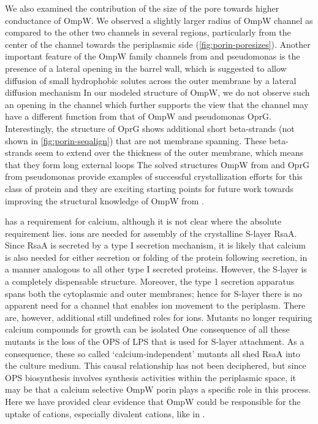 We also examined the contribution of the size of the pore towards higher conductance of \caulobacter OmpW. We observed a slightly larger radius of \caulobacter OmpW channel as compared to the other two channels in several regions, particularly from the center of the channel towards the periplasmic side (\cref{fig:porin-poresizes}). Another important feature of the OmpW family channels from \ecoli and \ac{pseudomonas} is the presence of a lateral opening in the barrel wall, which is suggested to allow diffusion of small hydrophobic solutes across the outer membrane by a lateral diffusion mechanism In our modeled structure of \caulobacter OmpW, we do not observe such an opening in the channel which further supports the view that the \caulobacter channel may have a different function from that of \ecoli OmpW and \ac{pseudomonas} OprG. Interestingly, the structure of OprG shows additional short beta-strands (not shown in \cref{fig:porin-seqalign}) that are not membrane spanning. These beta-strands seem to extend over the thickness of the outer membrane, which means that they form long external loops The solved structures OmpW from \ecoli and OprG from \ac{pseudomonas} provide examples of  successful crystallization efforts for this class of protein and they are exciting starting points for future work towards improving the structural knowledge of OmpW from \caulobacter.

\caulobacter has a requirement for calcium, although it is not clear where the absolute requirement lies.  ions are needed for assembly of the crystalline \ac{S-layer} RsaA. Since RsaA is secreted by a type I secretion mechanism, it is likely that calcium is also needed for either secretion or folding of the protein following secretion, in a manner analogous to all other type I secreted proteins.  However, the \ac{S-layer} is a completely dispensable structure. Moreover, the type 1 secretion apparatus spans both the cytoplasmic and outer membranes; hence for \ac{S-layer} there is no apparent need for a channel that enables  ion movement to the periplasm. There are, however, additional still undefined roles for  ions. Mutants no longer requiring calcium compounds for growth can be isolated One consequence of all these mutants is the loss of the \ac{OPS} of \ac{LPS} that is used for \ac{S-layer} attachment. As a consequence, these so called `calcium-independent' mutants all shed RsaA into the culture medium. This causal relationship has not been deciphered, but since \ac{OPS} biosynthesis involves synthesis activities within the periplasmic space, it may be that a calcium selective OmpW porin plays a specific role in this process. Here we have provided clear evidence that OmpW could be responsible for the uptake of cations, especially divalent cations, like  in \caulobacter. 
